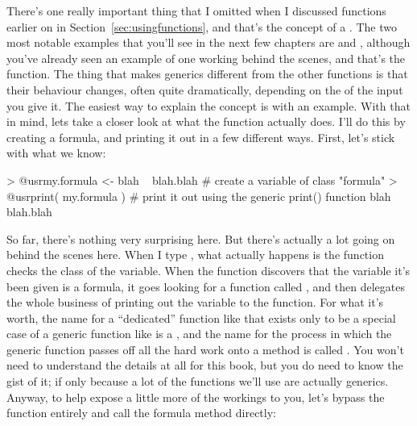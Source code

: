 There's one really important thing that I omitted when I discussed functions earlier on in Section~\ref{sec:usingfunctions}, and that's the concept of a . The two most notable examples that you'll see in the next few chapters are  and , although you've already seen an example of one working behind the scenes, and that's the  function. The thing that makes generics different from the other functions is that their behaviour changes, often quite dramatically, depending on the  of the input you give it. The easiest way to explain the concept is with an example. With that in mind, lets take a closer look at what the  function actually does. I'll do this by creating a formula, and printing it out in a few different ways. First, let's stick with what we know:
\begin{rblock1}
> @usr{my.formula <- blah ~ blah.blah }   # create a variable of class "formula"
> @usr{print( my.formula )}               # print it out using the generic print() function
blah ~ blah.blah
\end{rblock1}
So far, there's nothing very surprising here. But there's actually a lot going on behind the scenes here. When I type , what actually happens is the  function checks the class of the  variable. When the function discovers that the variable it's been given is a formula, it goes looking for a function called , and then delegates the whole business of printing out the variable to the  function. For what it's worth, the name for a ``dedicated'' function like  that exists only to be a special case of a generic function like  is a , and the name for the process in which the generic function passes off all the hard work onto a method is called . You won't need to understand the details at all for this book, but you do need to know the gist of it; if only because a lot of the functions we'll use are actually generics. Anyway, to help expose a little more of the workings to you, let's bypass the  function entirely and call the formula method directly:

